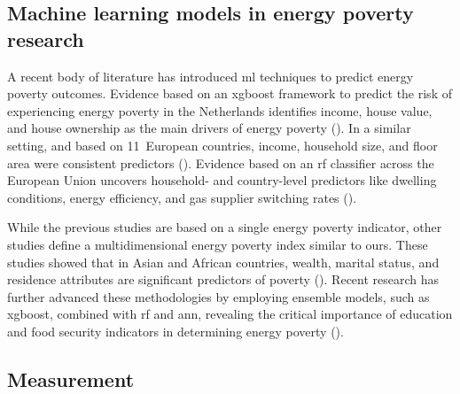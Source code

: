\documentclass[preprint,authoryear,12pt]{elsarticle}
\newcommand{\citeTwo}[1]{(\cite{#1})}
\begin{document}
\subsection{Machine learning models in energy poverty research} \label{Machine_learning_models_in_energy_poverty_research}

A recent body of literature has introduced \Gls{ml} techniques to predict energy poverty outcomes. Evidence based on an \Gls{xgboost} framework to predict the risk of experiencing energy poverty in the Netherlands identifies income, house value, and house ownership as the main drivers of energy poverty \citeTwo{DSv21}. In a similar setting, and based on 11~European countries, income, household size, and floor area were consistent predictors \citeTwo{vDv22}. Evidence based on an \Gls{rf} classifier across the European Union uncovers household- and country-level predictors like dwelling conditions, energy efficiency, and gas supplier switching rates \citeTwo{SRL23}.


While the previous studies are based on a single energy poverty indicator, other studies define a multidimensional energy poverty index similar to ours. These studies showed that in Asian and African countries, wealth, marital status, and residence attributes are significant predictors of poverty \citeTwo{ALXBR20}. Recent research has further advanced these methodologies by employing ensemble models, such as \Gls{xgboost}, combined with \Gls{rf} and \Gls{ann}, revealing the critical importance of education and food security indicators in determining energy poverty \citeTwo{GJA24}.

\subsection{Measurement} \label{Measurement}
\end{document}
